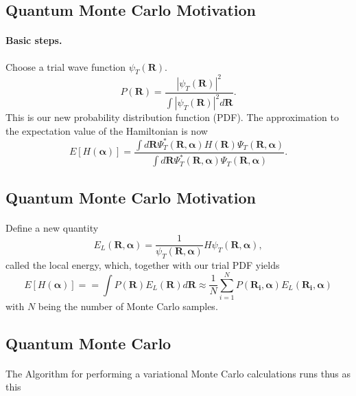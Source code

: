 \documentclass[%
twoside,                 %
final,                   %
10pt]{article}
\begin{document}
\noindent




\subsection*{Quantum Monte Carlo Motivation}

\paragraph{Basic steps.}
Choose a trial wave function
$\psi_T(\bm{R})$.
\[
   P(\bm{R})= \frac{\left|\psi_T(\bm{R})\right|^2}{\int \left|\psi_T(\bm{R})\right|^2d\bm{R}}.
\]
This is our new probability distribution function  (PDF).
The approximation to the expectation value of the Hamiltonian is now 
\[
   E[H(\bm{\alpha})] = 
   \frac{\int d\bm{R}\Psi^{\ast}_T(\bm{R},\bm{\alpha})H(\bm{R})\Psi_T(\bm{R},\bm{\alpha})}
        {\int d\bm{R}\Psi^{\ast}_T(\bm{R},\bm{\alpha})\Psi_T(\bm{R},\bm{\alpha})}.
\]




\subsection*{Quantum Monte Carlo Motivation}

\paragraph{}
Define a new quantity
\[
   E_L(\bm{R},\bm{\alpha})=\frac{1}{\psi_T(\bm{R},\bm{\alpha})}H\psi_T(\bm{R},\bm{\alpha}),
   \label{eq:locale1}
\]
called the local energy, which, together with our trial PDF yields
\[
  E[H(\bm{\alpha})]= = \int P(\bm{R})E_L(\bm{R}) d\bm{R}\approx \frac{1}{N}\sum_{i=1}^NP(\bm{R_i},\bm{\alpha})E_L(\bm{R_i},\bm{\alpha})
  \label{eq:vmc1}
\]
with $N$ being the number of Monte Carlo samples.








\subsection*{Quantum Monte Carlo}

\paragraph{}
The Algorithm for performing a variational Monte Carlo calculations runs thus as this
\end{document}
